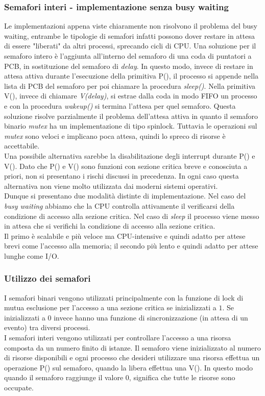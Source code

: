 \subsubsection{Semafori interi - implementazione senza busy waiting}
Le implementazioni appena viste chiaramente non risolvono il problema del busy waiting, entrambe le tipologie di semafori infatti possono dover restare in attesa di essere "liberati" da altri processi, sprecando cicli di CPU. Una soluzione per il semaforo intero è l'aggiunta all'interno del semaforo di una coda di puntatori a PCB, in sostituzione del semaforo di \emph{delay}. In questo modo, invece di restare in attesa attiva durante l'esecuzione della primitiva P(), il processo si appende nella lista di PCB del semaforo per poi chiamare la procedura \emph{sleep()}.
Nella primitiva V(), invece di chiamare \emph{V(delay)}, si estrae dalla coda in modo FIFO un processo e con la procedura \emph{wakeup()} si termina l'attesa per quel semaforo.
Questa soluzione risolve parzialmente il problema dell'attesa attiva in quanto il semaforo binario \emph{mutex} ha un implementazione di tipo spinlock. Tuttavia le operazioni sul \emph{mutex} sono veloci e implicano poca attesa, quindi lo spreco di risorse è accettabile.
\\
Una possibile alternativa sarebbe la disabilitazione degli interrupt durante P() e V(). Dato che P() e V() sono funzioni con sezione critica breve e conosciuta a priori, non si presentano i rischi discussi in precedenza. In ogni caso questa alternativa non viene molto utilizzata dai moderni sistemi operativi.
\\
Dunque si presentano due modalità distinte di implementazione. Nel caso del \emph{busy waiting} abbiamo che la CPU controlla attivamente il verificarsi della condizione di accesso alla sezione critica. Nel caso di \emph{sleep} il processo viene messo in attesa che si verifichi la condizione di accesso alla sezione critica. \\
Il primo è scalabile e più veloce ma CPU-intensive e quindi adatto per attese brevi come l'accesso alla memoria; il secondo più lento e quindi adatto per attese lunghe come I/O.

\subsubsection{Utilizzo dei semafori}
I semafori binari vengono utilizzati principalmente con la funzione di lock di mutua esclusione per l'accesso a una sezione critica se inizializzati a $1$. Se inizializzati a $0$ invece hanno una funzione di sincronizzazione (in attesa di un evento) tra diversi processi.
\\
I semafori interi vengono utilizzati per controllare l'accesso a una risorsa composta da un numero finito di istanze. Il semaforo viene inizializzato al numero di risorse disponibili e ogni processo che desideri utilizzare una risorsa effettua un operazione P() sul semaforo, quando la libera effettua una V(). In questo modo quando il semaforo raggiunge il valore $0$, significa che tutte le risorse sono occupate.